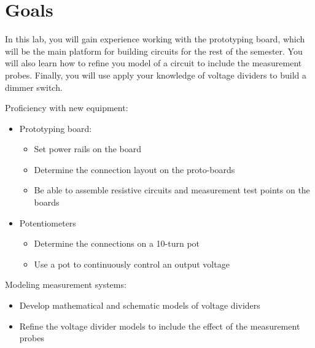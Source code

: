 \documentclass[10pt]{PhysLab1C} %
\begin{document}
\maketitle %


\thispagestyle{firstpage} %


\section{Goals}

In this lab, you will gain experience working with the prototyping
board, which will be the main platform for building circuits for the
rest of the semester. You will also learn how to refine you model of a
circuit to include the measurement probes. Finally, you will use apply
your knowledge of voltage dividers to build a dimmer switch.

Proficiency with new equipment:

\begin{itemize}
\item
  Prototyping board:

  \begin{itemize}
  \item
    Set power rails on the board
  \item
    Determine the connection layout on the proto-boards
  \item
    Be able to assemble resistive circuits and measurement test points
    on the boards
  \end{itemize}
\item
  Potentiometers

  \begin{itemize}
  \item
    Determine the connections on a 10-turn pot
  \item
    Use a pot to continuously control an output voltage
  \end{itemize}
\end{itemize}

Modeling measurement systems:

\begin{itemize}
\item
  Develop mathematical and schematic models of voltage dividers
\item
  Refine the voltage divider models to include the effect of the
  measurement probes
\end{itemize}
\end{document}
